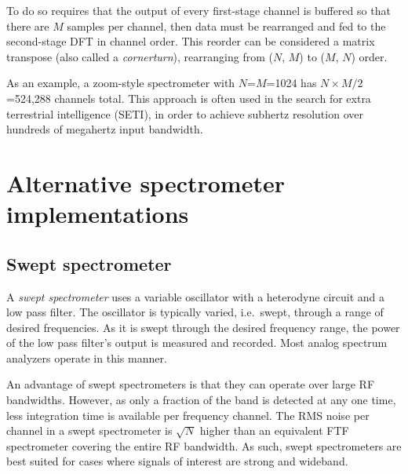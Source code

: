 \documentclass{ws-rv961x669}
\begin{document}
To do so requires that the output of every first-stage channel is buffered so that there are $M$ samples per channel, then data must be rearranged and fed to the second-stage DFT in channel order. This reorder can be considered a matrix transpose (also called a \emph{cornerturn}), rearranging from ($N$, $M$) to ($M$, $N$) order.

As an example, a zoom-style spectrometer with $N$=$M$=1024 has $N\times M / 2$=524,288 channels total. This approach is often used in the search for extra terrestrial intelligence (SETI), in order to achieve subhertz resolution over hundreds of megahertz input bandwidth.


\section{Alternative spectrometer implementations}

\subsection{Swept spectrometer}\label{swept-spectrometer}


A \emph{swept spectrometer} uses a variable oscillator with a heterodyne
circuit and a low pass filter. The oscillator is typically varied, i.e.~swept, through a range of desired frequencies. As it is swept through the desired frequency range, the power of the low pass filter's output is measured and recorded. Most analog spectrum analyzers operate in this manner.

An advantage of swept spectrometers is that they can operate over large RF bandwidths. However, as only a fraction of the band is detected at any one time, less integration time is available per frequency channel. 
The RMS noise per channel in a swept spectrometer is $\sqrt{N}$ higher than an equivalent FTF spectrometer covering the entire RF bandwidth. As such, swept spectrometers are best suited for cases where signals of interest are strong and wideband. 
\end{document}
